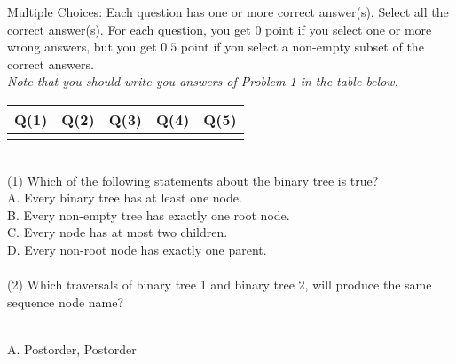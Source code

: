 \documentclass{article}
\begin{document}
Multiple Choices: Each question has one or more correct answer(s). Select all the correct answer(s). For each question, you get $0$ point if you select one or more wrong answers, but you get $0.5$ point if you select a non-empty subset of the correct answers.\\
\textit{Note that you should write you answers of Problem 1 in the table below.}
\begin{table}[htbp]
	\begin{tabular}{|p{1.5cm}|p{1.5cm}|p{1.5cm}|p{1.5cm}|p{8cm}|}
	\hline 
	Q(1) & Q(2) & Q(3) & Q(4) & Q(5) \\
	\hline 
	&&&&\\ 
	\hline 
	\end{tabular} 
\end{table} \\
(1) Which of the following statements about the binary tree is true? \\
A. Every binary tree has at least one node. \\
B. Every non-empty tree has exactly one root node. \\
C. Every node has at most two children. \\
D. Every non-root node has exactly one parent. \\
~\\
(2) Which traversals of binary tree 1 and binary tree 2, will produce the same sequence node name?\\
\begin{minipage}{1\textwidth}
	\centering
\end{minipage} \\
A. Postorder, Postorder \\
\end{document}
